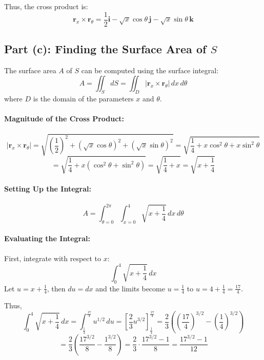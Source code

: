 \documentclass[11pt]{article}
\begin{document}
Thus, the cross product is:
\[
\boxed{ \mathbf{r}_x \times \mathbf{r}_\theta = \frac{1}{2} \mathbf{i} - \sqrt{x} \cos\theta \, \mathbf{j} - \sqrt{x} \sin\theta \, \mathbf{k} }
\]

\newpage

\subsection{Part (c): Finding the Surface Area of \( S \)}

The surface area \( A \) of \( S \) can be computed using the surface integral:
\[
A = \iint_{S} dS = \iint_{D} \left| \mathbf{r}_x \times \mathbf{r}_\theta \right| \, dx \, d\theta
\]
where \( D \) is the domain of the parameters \( x \) and \( \theta \).

\paragraph{Magnitude of the Cross Product:}
\[
\left| \mathbf{r}_x \times \mathbf{r}_\theta \right| = \sqrt{ \left( \frac{1}{2} \right )^2 + \left( \sqrt{x} \cos\theta \right )^2 + \left( \sqrt{x} \sin\theta \right )^2 } = \sqrt{ \frac{1}{4} + x \cos^2\theta + x \sin^2\theta }
\]
\[
= \sqrt{ \frac{1}{4} + x (\cos^2\theta + \sin^2\theta) } = \sqrt{ \frac{1}{4} + x } = \sqrt{ x + \frac{1}{4} }
\]

\paragraph{Setting Up the Integral:}
\[
A = \int_{\theta=0}^{2\pi} \int_{x=0}^{4} \sqrt{ x + \frac{1}{4} } \, dx \, d\theta
\]

\paragraph{Evaluating the Integral:}

First, integrate with respect to \( x \):
\[
\int_{0}^{4} \sqrt{ x + \frac{1}{4} } \, dx
\]
Let \( u = x + \frac{1}{4} \), then \( du = dx \) and the limits become \( u = \frac{1}{4} \) to \( u = 4 + \frac{1}{4} = \frac{17}{4} \).

Thus,
\[
\int_{0}^{4} \sqrt{ x + \frac{1}{4} } \, dx = \int_{\frac{1}{4}}^{\frac{17}{4}} u^{1/2} \, du = \left[ \frac{2}{3} u^{3/2} \right ]_{\frac{1}{4}}^{\frac{17}{4}} = \frac{2}{3} \left( \left( \frac{17}{4} \right )^{3/2} - \left( \frac{1}{4} \right )^{3/2} \right )
\]
\[
= \frac{2}{3} \left( \frac{17^{3/2}}{8} - \frac{1^{3/2}}{8} \right ) = \frac{2}{3} \cdot \frac{17^{3/2} - 1}{8} = \frac{17^{3/2} - 1}{12}
\]
\end{document}
